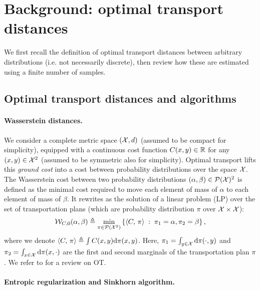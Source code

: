 \section{Background: optimal transport distances}

We first recall the definition of optimal transport distances between arbitrary distributions (i.e. not necessarily discrete), then review how these are estimated using a finite number of samples.

\subsection{Optimal transport distances and algorithms}

\paragraph{Wasserstein distances.} 

We consider a complete metric space $(\mathcal{X},d)$ (assumed to be compact for simplicity), equipped
with a continuous cost function $C(x,y) \in \mathbb{R}$ for any $(x,y) \in \mathcal{X}^2$ (assumed to be symmetric also for simplicity). 
%
Optimal transport lifts this \textit{ground cost} into a cost between probability
distributions over the space $\mathcal{X}$. 
%
The Wasserstein cost between two probability distributions $(\alpha, \beta) \in \mathcal{P}(\mathcal{X})^2$ is defined as the minimal cost required to move each element of mass of $\alpha$ to each element of mass of $\beta$. It rewrites as the solution of a
linear problem (LP) over the set of transportation plans (which are probability distribution $\pi$ over $\mathcal{X} \times \mathcal{X}$):
\begin{equation}\label{eq:wass_0}
    \mathcal{W}_{C,0}(\alpha, \beta) \triangleq 
    \min_{\pi \in \mathcal{P}(\mathcal{X}^2)}
    \left\{ 
    	\langle C,\,\pi\rangle
	 \;:\;  \pi_1=\alpha, \pi_2=\beta \right\},
\end{equation}
where we denote $\langle C,\,\pi\rangle \triangleq \int C(x,y) \textrm{d}\pi(x,y)$. Here, $\pi_1 =
\int_{y\in \mathcal{X}} \textrm{d} \pi(\cdot, y)$ and $\pi_2 = \int_{x\in \mathcal{X}} \textrm{d} \pi(x, \cdot)$
are the first and second marginals of the transportation plan $\pi$. We refer to
\cite{santambrogio2015optimal} for a review on OT.
%

\paragraph{Entropic regularization and Sinkhorn algorithm.} 

